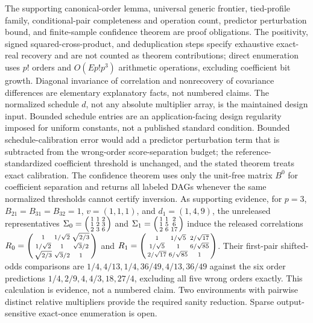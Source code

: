 \documentclass{article}
\begin{document}
The supporting canonical-order lemma, universal generic frontier, tied-profile family, conditional-pair completeness and operation count, predictor perturbation bound, and finite-sample confidence theorem are proof obligations. The positivity, signed squared-cross-product, and deduplication steps specify exhaustive exact-real recovery and are not counted as theorem contributions; direct enumeration uses \(p!\) orders and \(O(Ep!p^3)\) arithmetic operations, excluding coefficient bit growth. Diagonal invariance of correlation and nonrecovery of covariance differences are elementary explanatory facts, not numbered claims. The normalized schedule \(d\), not any absolute multiplier array, is the maintained design input. Bounded schedule entries are an application-facing design regularity imposed for uniform constants, not a published standard condition. Bounded schedule-calibration error would add a predictor perturbation term that is subtracted from the wrong-order score-separation budget; the reference-standardized coefficient threshold is unchanged, and the stated theorem treats exact calibration. The confidence theorem uses only the unit-free matrix \(B^0\) for coefficient separation and returns all labeled DAGs whenever the same normalized thresholds cannot certify inversion. As supporting evidence, for \(p=3\), \(B_{21}=B_{31}=B_{32}=1\), \(v=(1,1,1)\), and \(d_1=(1,4,9)\), the unreleased representatives \(\Sigma_0=\begin{psmallmatrix}1&1&2\\1&2&3\\2&3&6\end{psmallmatrix}\) and \(\Sigma_1=\begin{psmallmatrix}1&1&2\\1&5&6\\2&6&17\end{psmallmatrix}\) induce the released correlations \(R_0=\begin{psmallmatrix}1&1/\sqrt2&\sqrt{2/3}\\1/\sqrt2&1&\sqrt3/2\\\sqrt{2/3}&\sqrt3/2&1\end{psmallmatrix}\) and \(R_1=\begin{psmallmatrix}1&1/\sqrt5&2/\sqrt{17}\\1/\sqrt5&1&6/\sqrt{85}\\2/\sqrt{17}&6/\sqrt{85}&1\end{psmallmatrix}\). Their first-pair shifted-odds comparisons are \(1/4,4/13,1/4,36/49,4/13,36/49\) against the six order predictions \(1/4,2/9,4,4/3,18,27/4\), excluding all five wrong orders exactly. This calculation is evidence, not a numbered claim. Two environments with pairwise distinct relative multipliers provide the required sanity reduction. Sparse output-sensitive exact-once enumeration is open.
\end{document}
